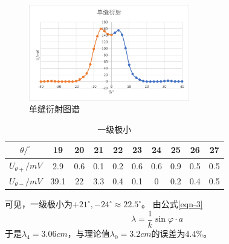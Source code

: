\documentclass[11pt]{article}
\begin{document}
\begin{figure}[H]
    \centering
    \includegraphics[width=7cm]{Fig/7.png}
    \caption{单缝衍射图谱}
\end{figure}
\begin{table}[!ht]
    \centering
    \caption{一级极小}
    \begin{tabular}{|c|c|c|c|c|c|c|c|c|c|}
    \hline
        $\theta /^\circ$ & 19 & 20 & 21 & 22 & 23 & 24 & 25 & 26 & 27 \\ \hline
        $U_{\theta +}/mV$ & 2.9 & 0.6 & 0.1 & 0.2 & 0.6 & 0.6 & 0.9 & 0.5 & 0.5 \\ \hline
        $U_{\theta -}/mV$ & 39.1 & 22 & 3.3 & 0.4 & 0.1 & 0 & 0.2 & 0.4 & 0.5 \\ \hline
    \end{tabular}
\end{table}
    可见，一级极小为$+21^\circ, -24^\circ\approx 22.5^\circ$。
    \newline \hspace*{2em}由公式\eqref{eqn-3}
    \begin{equation}
        \lambda=\frac{1}{k}\sin\varphi \cdot a
    \end{equation}
    \hspace*{2em}于是$\lambda_4=3.06cm$，与理论值$\lambda_0=3.2cm$的误差为$4.4\%$。
\end{document}
